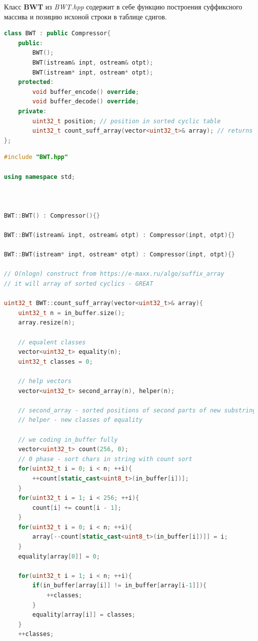 Класс {\bfseries BWT} из {\it BWT.hpp} содержит в себе функцию построения суффиксного массива и позицию исхоной строки в таблице сдигов. 

\begin{lstlisting}[language=C++]
class BWT : public Compressor{
    public:
        BWT();
        BWT(istream& inpt, ostream& otpt);
        BWT(istream* inpt, ostream* otpt);
    protected:
        void buffer_encode() override;
        void buffer_decode() override;
    private:
        uint32_t position; // position in sorted cyclic table
        uint32_t count_suff_array(vector<uint32_t>& array); // returns position
};
\end{lstlisting}

\begin{lstlisting}[language=C++]
#include "BWT.hpp"

using namespace std;



BWT::BWT() : Compressor(){}

BWT::BWT(istream& inpt, ostream& otpt) : Compressor(inpt, otpt){}

BWT::BWT(istream* inpt, ostream* otpt) : Compressor(inpt, otpt){}

// O(nlogn) construct from https://e-maxx.ru/algo/suffix_array
// it will array of sorted cyclics - GREAT

uint32_t BWT::count_suff_array(vector<uint32_t>& array){
    uint32_t n = in_buffer.size();
    array.resize(n);

    // equalent classes 
    vector<uint32_t> equality(n);
    uint32_t classes = 0;

    // help vectors
    vector<uint32_t> second_array(n), helper(n);

    // second_array - sorted positions of second parts of new substrings
    // helper - new classes of equality

    // we coding in_buffer fully
    vector<uint32_t> count(256, 0);
    // 0 phase - sort chars in string with count sort
    for(uint32_t i = 0; i < n; ++i){
        ++count[static_cast<uint8_t>(in_buffer[i])];
    }
    for(uint32_t i = 1; i < 256; ++i){
        count[i] += count[i - 1];
    }
    for(uint32_t i = 0; i < n; ++i){
        array[--count[static_cast<uint8_t>(in_buffer[i])]] = i;
    }
    equality[array[0]] = 0;
    
    for(uint32_t i = 1; i < n; ++i){
        if(in_buffer[array[i]] != in_buffer[array[i-1]]){
            ++classes;
        }
        equality[array[i]] = classes;
    }
    ++classes;


\end{lstlisting}
